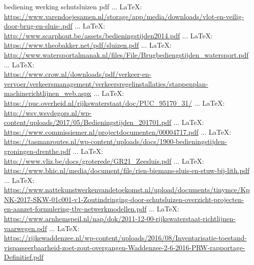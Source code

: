 \begin{thebibliography}{99}
{{bediening werking schutsluizen pdf
 ... \LaTeX:\\ \url{https://www.varendoejesamen.nl/storage/app/media/downloads/vlot-en-veilig-door-brug-en-sluis-.pdf}
 ... \LaTeX:\\ \url{http://www.scarphout.be/assets/bedieningstijden2014.pdf}
 ... \LaTeX:\\ \url{https://www.theobakker.net/pdf/sluizen.pdf}
 ... \LaTeX:\\ \url{http://www.watersportalmanak.nl/files/File/Brugbediengstijden_watersport.pdf}
 ... \LaTeX:\\ \url{https://www.crow.nl/downloads/pdf/verkeer-en-vervoer/verkeersmanagement/verkeersregelinstallaties/stappenplan-machinerichtlijnen_web.aspx}
 ... \LaTeX:\\ \url{https://puc.overheid.nl/rijkswaterstaat/doc/PUC_95170_31/}
 ... \LaTeX:\\ \url{http://wsv.wsvdegors.nl/wp-content/uploads/2017/05/Bedieningstijden_201701.pdf}
 ... \LaTeX:\\ \url{https://www.commissiemer.nl/projectdocumenten/00004717.pdf}
 ... \LaTeX:\\ \url{https://tasmanroutes.nl/wp-content/uploads/docs/1900-bedieningstijden-groningen-drenthe.pdf}
 ... \LaTeX:\\ \url{http://www.vliz.be/docs/groterede/GR21_Zeesluis.pdf}
 ... \LaTeX:\\ \url{https://www.bhic.nl/media/document/file/rien-biemans-sluis-en-stuw-bij-lith.pdf}
 ... \LaTeX:\\ \url{https://www.nattekunstwerkenvandetoekomst.nl/upload/documents/tinymce/KpNK-2017-SKW-01c001-v1-Zoutindringing-door-schutsluizen-overzicht-projecten-en-aanzet-formulering-tbv-netwerkmodellen.pdf}
 ... \LaTeX:\\ \url{https://www.arnhemspeil.nl/nap/dok/2011-12-00-rijkswaterstaat-richtlijnen-vaarwegen.pdf}
 ... \LaTeX:\\ \url{https://rijkewaddenzee.nl/wp-content/uploads/2016/08/Inventarisatie-toestand-vispasseerbaarheid-zoet-zout-overgangen-Waddenzee-2-6-2016-PRW-rapportage-Definitief.pdf}
}}
\end{thebibliography}
